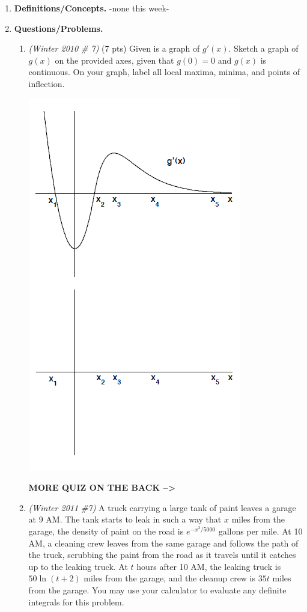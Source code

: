 \documentclass[11pt,letterpaper]{article}
\begin{document}
\begin{enumerate}

\item \textbf{Definitions/Concepts.} -none this week-

\vspace{1pc}
\item \textbf{Questions/Problems.} 
\begin{enumerate}
\item {\it (Winter 2010 \# 7)} (7 pts) Given is a graph of $g'(x)$.  Sketch a graph of $g(x)$ on the provided axes, given that $g(0)=0$ and $g(x)$ is continuous.  On your graph, label all local maxima, minima, and points of inflection.
\smallskip
\begin{center}
\includegraphics[width=.5\textwidth]{quiz4pic.png}
\end{center}

\vfill\hfill{\bf MORE QUIZ ON THE BACK --\textgreater}
\vfill
\item {\it (Winter 2011 \#7)}  A truck carrying a large tank of paint leaves a garage at 9 AM.  The tank starts to leak in such a way that $x$ miles from the garage, the density of paint on the road is $e^{-x^2/5000}$ gallons per mile.  At 10 AM, a cleaning crew leaves from the same garage and follows the path of the truck, scrubbing the paint from the road as it travels until it catches up to the leaking truck.  At $t$ hours after 10 AM, the leaking truck is $50\ln{(t+2)}$ miles from the garage, and the cleanup crew is $35t$ miles from the garage.  You may use your calculator to evaluate any definite integrals for this problem.


\end{enumerate}
\end{enumerate}
\end{document}
